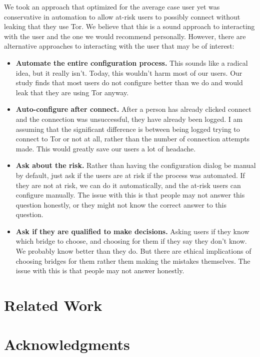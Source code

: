 \documentclass{template}
\begin{document}
We took an approach that optimized for the average case user yet was conservative in automation to allow at-risk users to possibly connect without leaking that they use Tor. We believe that this is a sound approach to interacting with the user and the one we would recommend personally. However, there are alternative approaches to interacting with the user that may be of interest:  
\begin{itemize} \itemsep1pt \parskip0pt  
\item{\bfseries Automate the entire configuration process.} This sounds like a radical idea, but it really isn't. Today, this wouldn't harm most of our users. Our study finds that most users do not configure better than we do and would leak that they are using Tor anyway. 
\item {\bfseries Auto-configure after connect.} After a person has already clicked connect and the connection was unsuccessful, they have already been logged. I am assuming that the significant difference is between being logged trying to connect to Tor or not at all, rather than the number of connection attempts made. This would greatly save our users a lot of headache. 
\item{\bfseries Ask about the risk.} Rather than having the configuration dialog be manual by default, just ask if the users are at risk if the process was automated. If they are not at risk, we can do it automatically, and the at-risk users can configure manually. The issue with this is that people may not answer this question honestly, or they might not know the correct answer to this question. 
\item{\bfseries Ask if they are qualified to make decisions.} Asking users if they know which bridge to choose, and choosing for them if they say they don't know. We probably know better than they do. But there are ethical implications of choosing bridges for them rather them making the mistakes themselves. The issue with this is that people may not answer honestly. 
\end{itemize}


\section{Related Work} 

\section {Acknowledgments}
\end{document}
